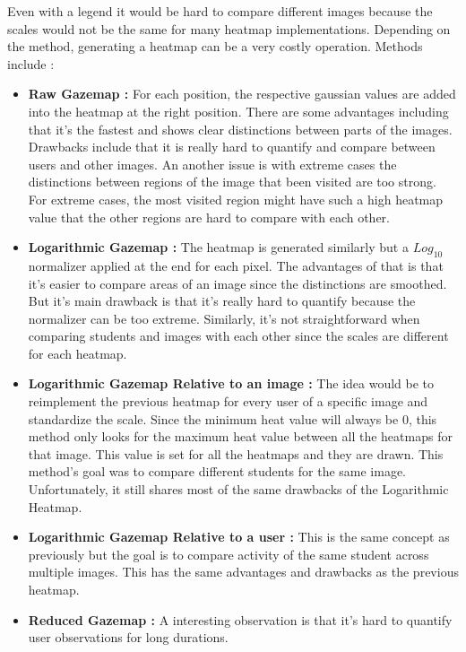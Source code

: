 \documentclass[a4paper,11pt]{report}
\numberwithin{figure}{section} %
\begin{document}
\begin{itemize}
        Even with a legend it would be hard to compare different images because the scales would not be the same for many heatmap implementations.
        Depending on the method, generating a heatmap can be a very costly operation.
        Methods include :
        \begin{itemize}
            \item \textbf{Raw Gazemap :} For each position, the respective gaussian values are added into the heatmap at the right position.
            There are some advantages including that it's the fastest and shows clear distinctions between parts of the images.
            Drawbacks include that it is really hard to quantify and compare between users and other images.
            An another issue is with extreme cases the distinctions between regions of the image that been visited are too strong.
            For extreme cases, the most visited region might have such a high heatmap value that the other regions are hard to compare with each other.
            \item \textbf{Logarithmic Gazemap :} The heatmap is generated similarly but a $Log_{10}$ normalizer applied at the end for each pixel.
            The advantages of that is that it's easier to compare areas of an image since the distinctions are smoothed.
            But it's main drawback is that it's really hard to quantify because the normalizer can be too extreme.
            Similarly, it's not straightforward when comparing students and images with each other since the scales are different for each heatmap.
            \item \textbf{Logarithmic Gazemap Relative to an image :} The idea would be to reimplement the previous heatmap for every user of a specific image and standardize the scale.
            Since the minimum heat value will always be 0, this method only looks for the maximum heat value between all the heatmaps for that image.
            This value is set for all the heatmaps and they are drawn. This method's goal was to compare different students for the same image.
            Unfortunately, it still shares most of the same drawbacks of the Logarithmic Heatmap.
            \item \textbf{Logarithmic Gazemap Relative to a user :} This is the same concept as previously but the goal is to compare activity of the same student across multiple images.
            This has the same advantages and drawbacks as the previous heatmap.
            \item \textbf{Reduced Gazemap :} A interesting observation is that it's hard to quantify user observations for long durations.

\end{itemize}
\end{itemize}
\end{document}
